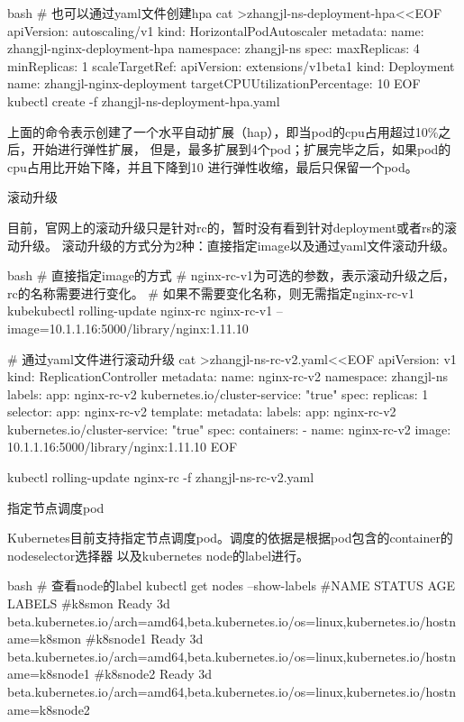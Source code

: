 \begin{outline}[enumerate]
\begin{code-block}{bash}
# 也可以通过yaml文件创建hpa
cat >zhangjl-ns-deployment-hpa<<EOF
apiVersion: autoscaling/v1
kind: HorizontalPodAutoscaler
metadata:
  name: zhangjl-nginx-deployment-hpa
  namespace: zhangjl-ns
spec:
  maxReplicas: 4
  minReplicas: 1
  scaleTargetRef:
    apiVersion: extensions/v1beta1
    kind: Deployment
    name: zhangjl-nginx-deployment
  targetCPUUtilizationPercentage: 10
EOF
kubectl create -f zhangjl-ns-deployment-hpa.yaml

\end{code-block}
上面的命令表示创建了一个水平自动扩展（hap），即当pod的cpu占用超过10\%之后，开始进行弹性扩展，
但是，最多扩展到4个pod；扩展完毕之后，如果pod的cpu占用比开始下降，并且下降到10%
进行弹性收缩，最后只保留一个pod。

\1 滚动升级

目前，官网上的滚动升级只是针对rc的，暂时没有看到针对deployment或者rs的滚动升级。
滚动升级的方式分为2种：直接指定image以及通过yaml文件滚动升级。
\begin{code-block}{bash}
# 直接指定image的方式
# nginx-rc-v1为可选的参数，表示滚动升级之后，rc的名称需要进行变化。
# 如果不需要变化名称，则无需指定nginx-rc-v1
kubekubectl rolling-update nginx-rc nginx-rc-v1 --image=10.1.1.16:5000/library/nginx:1.11.10

# 通过yaml文件进行滚动升级
cat >zhangjl-ns-rc-v2.yaml<<EOF
apiVersion: v1
kind: ReplicationController
metadata:
  name: nginx-rc-v2
  namespace: zhangjl-ns
  labels:
    app: nginx-rc-v2
    kubernetes.io/cluster-service: "true"
spec:
  replicas: 1
  selector:
    app: nginx-rc-v2
  template:
    metadata:
      labels:
        app: nginx-rc-v2
        kubernetes.io/cluster-service: "true"
    spec:
      containers:
      - name: nginx-rc-v2
        image: 10.1.1.16:5000/library/nginx:1.11.10
EOF

kubectl rolling-update nginx-rc -f zhangjl-ns-rc-v2.yaml
\end{code-block}

\1 指定节点调度pod

Kubernetes目前支持指定节点调度pod。调度的依据是根据pod包含的container的nodeselector选择器
以及kubernetes node的label进行。
\begin{code-block}{bash}
# 查看node的label
kubectl get nodes --show-labels
#NAME       STATUS    AGE       LABELS
#k8smon     Ready     3d        beta.kubernetes.io/arch=amd64,beta.kubernetes.io/os=linux,kubernetes.io/hostname=k8smon
#k8snode1   Ready     3d        beta.kubernetes.io/arch=amd64,beta.kubernetes.io/os=linux,kubernetes.io/hostname=k8snode1
#k8snode2   Ready     3d        beta.kubernetes.io/arch=amd64,beta.kubernetes.io/os=linux,kubernetes.io/hostname=k8snode2


\end{code-block}
\end{outline}
